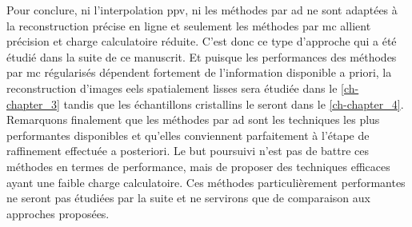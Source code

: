 Pour conclure, ni l'interpolation \gls{ppv}, ni les méthodes par \gls{ad} ne sont adaptées à la reconstruction précise en ligne et seulement les méthodes par \gls{mc} allient précision et charge calculatoire réduite. C'est donc ce type d'approche qui a été étudié dans la suite de ce manuscrit. Et puisque les performances des méthodes par \gls{mc} régularisés dépendent fortement de l'information disponible a priori, la reconstruction d'images \gls{eels} spatialement lisses sera étudiée dans le \cref{ch-chapter_3} tandis que les échantillons cristallins le seront dans le \cref{ch-chapter_4}. Remarquons finalement que les méthodes par \gls{ad} sont les techniques les plus performantes disponibles et qu'elles conviennent parfaitement à l'étape de raffinement effectuée a posteriori. Le but poursuivi n'est pas de battre ces méthodes en termes de performance, mais de proposer des techniques efficaces ayant une faible charge calculatoire.  Ces méthodes particulièrement performantes ne seront pas étudiées par la suite et ne servirons que de comparaison aux approches proposées. 

